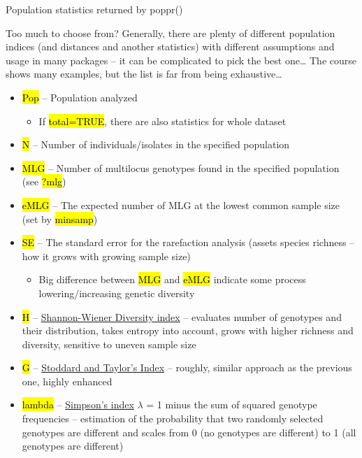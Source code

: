 \documentclass[compress, ucs, xelatex, 11pt, xcolor=svgnames,
  hyperref={
    bookmarks=true,
    unicode=true,
    colorlinks=true,
    pdftitle={Molecular data in R},
    plainpages=false,
    pdfauthor={Vojtech Zeisek},
    pdfsubject={Course about phylogeny and evolution in R},
    pdfcreator={XeLaTeX},
    pdfkeywords={R, evolution, phylogeny, molecular data},
    linkcolor=Tomato,
    anchorcolor=SaddleBrown,
    citecolor=Goldenrod,
    filecolor=DarkMagenta,
    menucolor=Sienna,
    urlcolor=DarkTurquoise,
    pdftex},
  url={hyphens, lowtilde} %
  ]{beamer}
\renewcommand{\texttt}[1]{\hl{\ttfamily #1}}
\begin{document}
\begin{frame}[allowframebreaks]{Population statistics returned by poppr()}
  \begin{block}{Too much to choose from?}
    Generally, there are plenty of different population indices (and distances and another statistics) with different assumptions and usage in many packages -- it can be complicated to pick the best one\ldots{ }The course shows many examples, but the list is far from being exhaustive\ldots
  \end{block}
  \begin{itemize}
    \item \texttt{Pop} -- Population analyzed
    \begin{itemize}
      \item If \texttt{total=TRUE}, there are also statistics for whole dataset
    \end{itemize}
    \item \texttt{N} -- Number of individuals/isolates in the specified population
    \item \texttt{MLG} -- Number of multilocus genotypes found in the specified population (see \texttt{?mlg})
    \item \texttt{eMLG} -- The expected number of MLG at the lowest common sample size (set by \texttt{minsamp})
    \item \texttt{SE} -- The standard error for the rarefaction analysis (assets species richness -- how it grows with growing sample size)
    \begin{itemize}
      \item Big difference between \texttt{MLG} and \texttt{eMLG} indicate some process lowering/increasing genetic diversity
    \end{itemize}
    \item \texttt{H} -- \href{https://en.wikipedia.org/wiki/Diversity_index\#Shannon_index}{Shannon-Wiener Diversity index} -- evaluates number of genotypes and their distribution, takes entropy into account, grows with higher richness and diversity, sensitive to uneven sample size
    \item \texttt{G} -- \href{http://www.genetics.org/content/118/4/705}{Stoddard and Taylor's Index} -- roughly, similar approach as the previous one, highly enhanced
    \item \texttt{lambda} -- \href{https://en.wikipedia.org/wiki/Diversity_index\#Simpson_index}{Simpson's index} $\lambda$ = 1 minus the sum of squared genotype frequencies -- estimation of the probability that two randomly selected genotypes are different and scales from 0 (no genotypes are different) to 1 (all genotypes are different)

\end{itemize}
\end{frame}
\end{document}
